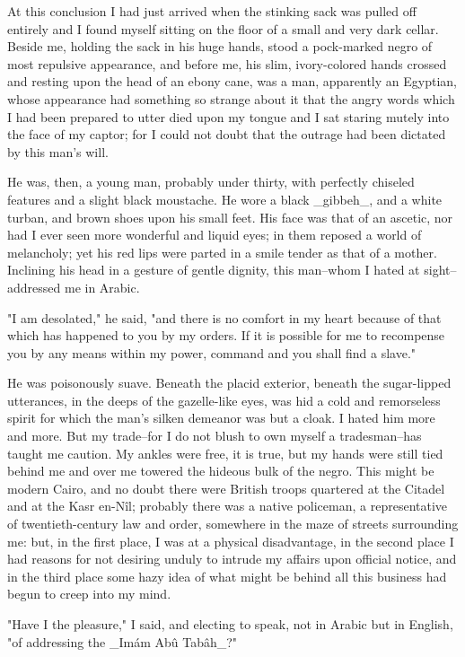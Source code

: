 At this conclusion I had just arrived when the stinking sack was
pulled off entirely and I found myself sitting on the floor of a small
and very dark cellar. Beside me, holding the sack in his huge hands,
stood a pock-marked negro of most repulsive appearance, and before me,
his slim, ivory-colored hands crossed and resting upon the head of an
ebony cane, was a man, apparently an Egyptian, whose appearance had
something so strange about it that the angry words which I had been
prepared to utter died upon my tongue and I sat staring mutely into
the face of my captor; for I could not doubt that the outrage had been
dictated by this man's will.

He was, then, a young man, probably under thirty, with perfectly
chiseled features and a slight black moustache. He wore a black
_gibbeh_, and a white turban, and brown shoes upon his small feet. His
face was that of an ascetic, nor had I ever seen more wonderful and
liquid eyes; in them reposed a world of melancholy; yet his red lips
were parted in a smile tender as that of a mother. Inclining his head
in a gesture of gentle dignity, this man--whom I hated at
sight--addressed me in Arabic.

"I am desolated," he said, "and there is no comfort in my heart
because of that which has happened to you by my orders. If it is
possible for me to recompense you by any means within my power,
command and you shall find a slave."

He was poisonously suave. Beneath the placid exterior, beneath the
sugar-lipped utterances, in the deeps of the gazelle-like eyes, was
hid a cold and remorseless spirit for which the man's silken demeanor
was but a cloak. I hated him more and more. But my trade--for I do not
blush to own myself a tradesman--has taught me caution. My ankles were
free, it is true, but my hands were still tied behind me and over me
towered the hideous bulk of the negro. This might be modern Cairo, and
no doubt there were British troops quartered at the Citadel and at
the Kasr en-Nîl; probably there was a native policeman, a
representative of twentieth-century law and order, somewhere in the
maze of streets surrounding me: but, in the first place, I was at a
physical disadvantage, in the second place I had reasons for not
desiring unduly to intrude my affairs upon official notice, and in the
third place some hazy idea of what might be behind all this business
had begun to creep into my mind.

"Have I the pleasure," I said, and electing to speak, not in Arabic
but in English, "of addressing the _Imám Abû Tabâh_?"

